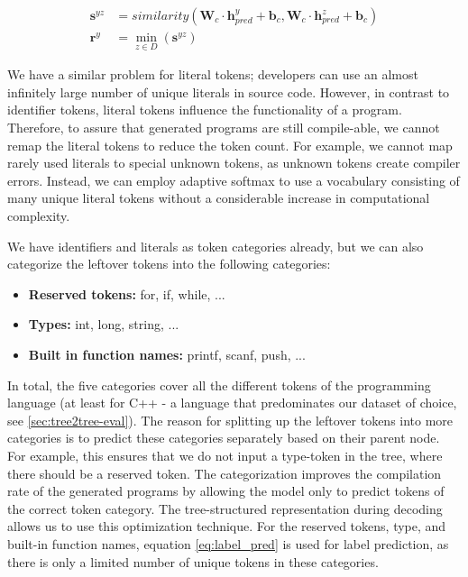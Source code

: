 \begin{align}
    \mathbf{s}^{yz} &= similarity(\mathbf{W}_c \cdot \mathbf{h}^y_{pred} + \mathbf{b}_c,  \mathbf{W}_c \cdot \mathbf{h}^z_{pred} + \mathbf{b}_c) \\
    \mathbf{r}^y &= \min_{z \in D}(\mathbf{s}^{yz})
\end{align}



We have a similar problem for literal tokens; developers can use an almost infinitely large number of unique literals in source code. However, in contrast to identifier tokens, literal tokens influence the functionality of a program. Therefore, to assure that generated programs are still compile-able, we cannot remap the literal tokens to reduce the token count. For example, we cannot map rarely used literals to special unknown tokens, as unknown tokens create compiler errors. Instead, we can employ adaptive softmax \cite{grave2017efficient} to use a vocabulary consisting of many unique literal tokens without a considerable increase in computational complexity.



We have identifiers and literals as token categories already, but we can also categorize the leftover tokens into the following categories:

\begin{itemize}
    \item \textbf{Reserved tokens:} for, if, while, ...
    \item \textbf{Types:} int, long, string, ...
    \item \textbf{Built in function names:} printf, scanf, push, ...
\end{itemize}



In total, the five categories cover all the different tokens of the programming language (at least for C++ - a language that predominates our dataset of choice, see \ref{sec:tree2tree-eval}). The reason for splitting up the leftover tokens into more categories is to predict these categories separately based on their parent node. For example, this ensures that we do not input a type-token in the tree, where there should be a reserved token. The categorization improves the compilation rate of the generated programs by allowing the model only to predict tokens of the correct token category. The tree-structured representation during decoding allows us to use this optimization technique. For the reserved tokens, type, and built-in function names, equation \ref{eq:label_pred} is used for label prediction, as there is only a limited number of unique tokens in these categories. 



